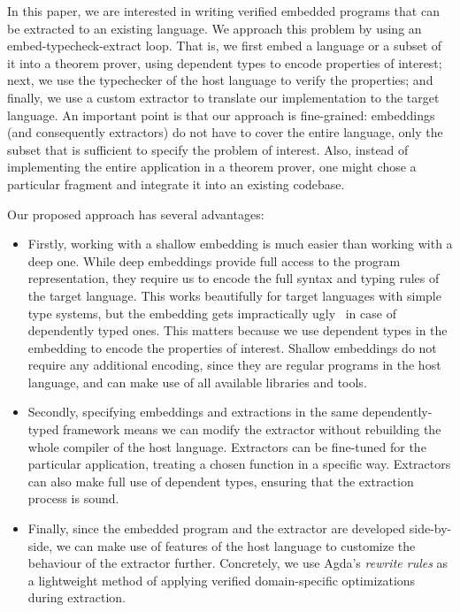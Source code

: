 \documentclass[acmsmall,review,anonymous]{acmart}\settopmatter{printfolios=true,printccs=false,printacmref=false}
\begin{document}
In this paper, we are interested in writing verified embedded programs
that can be extracted to an existing language.  We approach this problem by
using an embed-typecheck-extract loop.  That is, we first embed a
language or a subset of it into a theorem prover, using dependent
types to encode properties of interest; next, we use the typechecker of
the host language to verify the properties; and finally, we use a
custom extractor to translate our implementation to the target
language.
%
An important point is that our approach is fine-grained: embeddings
(and consequently extractors) do not have to cover the entire
language, only the subset that is sufficient to specify the problem of
interest.  Also, instead of implementing the entire application in a
theorem prover, one might chose a particular fragment and integrate it
into an existing codebase.

Our proposed approach has several advantages:
\begin{itemize}
  \item Firstly, working with a shallow embedding is much easier than
  working with a deep one.  While deep embeddings provide full access
  to the program representation, they require us to encode the full
  syntax and typing rules of the target language.
  This works beautifully for target languages with simple
  type systems, but the embedding gets impractically
  ugly~\cite{10.1145/1863495.1863497} in
  case of dependently typed ones.  This matters because we use
  dependent types in the embedding to encode the properties of
  interest.  Shallow embeddings do not require any additional
  encoding, since they are regular programs in the host language, and
  can make use of all available libraries and tools.

  \item Secondly, specifying embeddings and extractions in the same
  dependently-typed framework means we can modify the extractor
  without rebuilding the whole compiler of the host language.
  Extractors can be fine-tuned for the particular application, \eg{}
  treating a chosen function in a specific way.  Extractors can also make
  full use of dependent types, ensuring that the extraction process is
  sound.

  \item Finally, since the embedded program and the extractor are
  developed side-by-side, we can make use of features of the host
  language to customize the behaviour of the extractor
  further. Concretely, we use Agda's \emph{rewrite rules} as a
  lightweight method of applying verified domain-specific
  optimizations during extraction.
\end{itemize}
\end{document}
